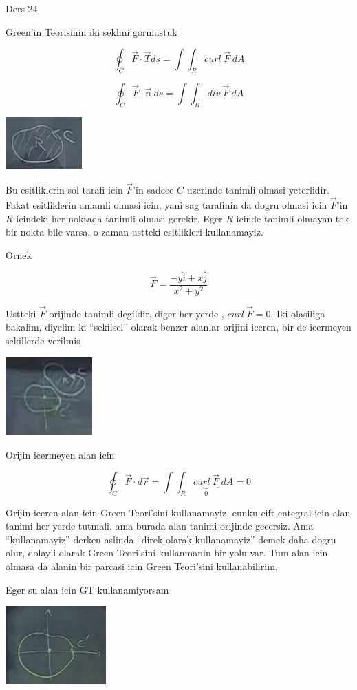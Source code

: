 \documentclass[12pt,fleqn]{article}
\begin{document}
Ders 24

Green'in Teorisinin iki seklini gormustuk

\[ \oint_C \vec{F} \cdot \vec{T} ds = \int \int_R curl \ \vec{F} \ dA \]

\[ \oint_C \vec{F} \cdot \vec{n} \ ds = \int \int_R div \ \vec{F} \ dA \]


\includegraphics[height=2cm]{24_1.png}

Bu esitliklerin sol tarafi icin $\vec{F}$'in sadece $C$ uzerinde tanimli
olmasi yeterlidir. Fakat esitliklerin anlamli olmasi icin, yani sag
tarafinin da dogru olmasi icin $\vec{F}$'in $R$ icindeki her noktada tanimli
olmasi gerekir. Eger $R$ icinde tanimli olmayan tek bir nokta bile varsa, o
zaman ustteki esitlikleri kullanamayiz.

Ornek 

\[ \vec{F} = \frac{ -y\hat{i} + x\hat{j}}{x^2+y^2} \]

Ustteki $\vec{F}$ orijinde tanimli degildir, diger her yerde , $curl \
\vec{F} = 0$. 
Iki olasiliga bakalim, diyelim ki ``sekilsel'' olarak benzer alanlar orijini
iceren, bir de icermeyen sekillerde verilmis

\includegraphics[height=3cm]{24_2.png}

Orijin icermeyen alan icin

\[ \oint_C \vec{F} \cdot d\vec{r} = 
\int \int_R \underbrace{curl \ \vec{F}}_{0} \ dA  = 0
\]
 
Orijin iceren alan icin Green Teori'sini kullanamayiz, cunku cift entegral
icin alan tanimi her yerde tutmali, ama burada alan tanimi orijinde
gecersiz. Ama ``kullanamayiz'' derken aslinda ``direk olarak kullanamayiz''
demek daha dogru olur, dolayli olarak Green Teori'sini kullanmanin bir yolu
var. Tum alan icin olmasa da alanin bir parcasi icin Green Teori'sini
kullanabilirim. 

Eger su alan icin GT kullanamiyorsam

\includegraphics[height=3cm]{24_3.png}
\end{document}
